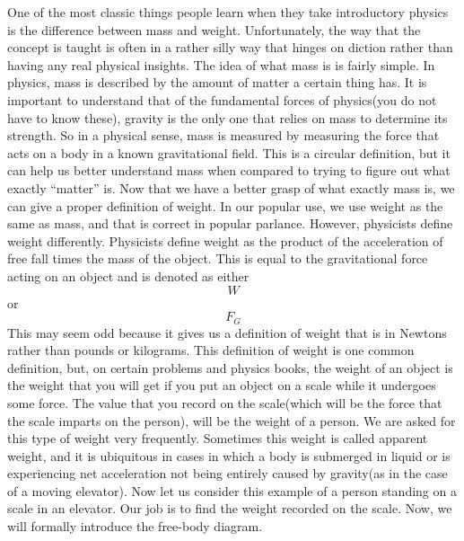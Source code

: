 One of the most classic things people learn when they take introductory physics is the difference between mass and weight. Unfortunately, the way that the concept is taught is often in a rather silly way that hinges on diction rather than having any real physical insights. The idea of what mass is is fairly simple. In physics, mass is described by the amount of matter a certain thing has. It is important to understand that of the fundamental forces of physics(you do not have to know these), gravity is the only one that relies on mass to determine its strength. So in a physical sense, mass is measured by measuring the force that acts on a body in a known gravitational field. This is a circular definition, but it can help us better understand mass when compared to trying to figure out what exactly “matter” is. Now that we have a better grasp of what exactly mass is, we can give a proper definition of weight. In our popular use, we use weight as the same as mass, and that is correct in popular parlance. However, physicists define weight differently. Physicists define weight as the product of the acceleration of free fall times the mass of the object. This is equal to the gravitational force acting on an object and is denoted as either $$W$$ or $$F_G$$ This may seem odd because it gives us a definition of weight that is in Newtons rather than pounds or kilograms. This definition of weight is one common definition, but, on certain problems and  physics books, the weight of an object is the weight that you will get if you put an object on a scale while it undergoes some force. The value that you record on the scale(which will be the force that the scale imparts on the person), will be the weight of a person. We are asked for this type of weight very frequently. Sometimes this weight is called apparent weight, and it is ubiquitous in cases in which a body is submerged in liquid or is experiencing net acceleration not being entirely caused by gravity(as in the case of a moving elevator). Now let us consider this example of a person standing on a scale in an elevator. Our job is to find the weight recorded on the scale. Now, we will formally introduce the free-body diagram. 

